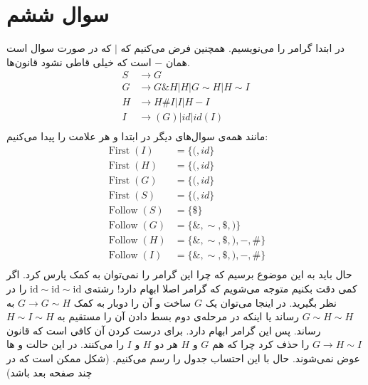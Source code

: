 \documentclass[]{article}
\begin{document}
\section*{سوال ششم}
در ابتدا گرامر را می‌نویسیم. همچنین فرض می‌کنیم که
$|$
که در صورت سوال است همان
$-$
است که خیلی قاطی نشود قانون‌ها.
\begin{align*}
    S &\rightarrow G\\
    G &\rightarrow G\&H \big| H \big| G \sim H \big| H \sim I\\
    H &\rightarrow H\#I \big| I \big| H-I\\
    I &\rightarrow (G) \big| id \big| id(I)\\
\end{align*}
مانند همه‌ی سوال‌های دیگر در ابتدا
 و 
هر علامت را پیدا می‌کنیم:
\begin{align*}
    \operatorname{First}(I) &= \{(, id\}\\
    \operatorname{First}(H) &= \{(, id\}\\
    \operatorname{First}(G) &= \{(, id\}\\
    \operatorname{First}(S) &= \{(, id\}\\
    \operatorname{Follow}(S) &= \{\$\}\\
    \operatorname{Follow}(G) &= \{\&, \sim, \$, )\}\\
    \operatorname{Follow}(H) &= \{\&, \sim, \$, ), -, \#\}\\
    \operatorname{Follow}(I) &= \{\&, \sim, \$, ), -, \#\}\\
\end{align*}
حال باید به این موضوع برسیم که چرا این گرامر را نمی‌توان به کمک
پارس کرد. اگر کمی دقت بکنیم متوجه می‌شویم که گرامر اصلا ابهام دارد!
رشته‌ی
$\text{id} \sim \text{id} \sim \text{id}$
را در نظر بگیرید.  در اینجا می‌توان یک
$G$
ساخت و آن را دوبار به کمک
$G \rightarrow G \sim H$
به
$G \sim H \sim H$
رساند یا اینکه در مرحله‌ی دوم بسط دادن آن را مستقیم به
$H \sim I \sim H$
رساند. پس این گرامر ابهام دارد. برای درست کردن آن کافی است که قانون
$G \rightarrow H \sim I$
را حذف کرد چرا که هم
$G$ و $H$ هر دو $H$ و $I$ را 
می‌کنند. در این حالت
 و ها
عوض نمی‌شوند. حال با این احتساب  جدول
را رسم می‌کنیم.
(شکل ممکن است که در چند صفحه بعد باشد)
\end{document}
